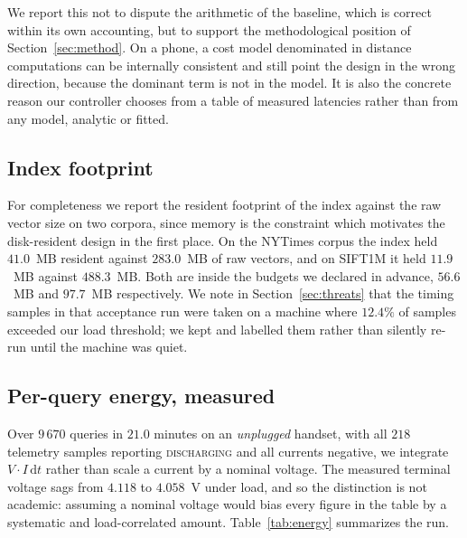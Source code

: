 \documentclass[journal]{IEEEtran}
\begin{document}
We report this not to dispute the arithmetic of the baseline, which is
correct within its own accounting, but to support the methodological
position of Section~\ref{sec:method}. On a phone, a cost model denominated
in distance computations can be internally consistent and still point the
design in the wrong direction, because the dominant term is not in the
model. It is also the concrete reason our controller chooses from a table
of measured latencies rather than from any model, analytic or fitted.

\subsection{Index footprint}

For completeness we report the resident footprint of the index against the
raw vector size on two corpora, since memory is the constraint which
motivates the disk-resident design in the first place. On the NYTimes
corpus the index held $41.0$~MB resident against $283.0$~MB of raw vectors,
and on SIFT1M it held $11.9$~MB against $488.3$~MB. Both are inside the
budgets we declared in advance, $56.6$~MB and $97.7$~MB respectively. We
note in Section~\ref{sec:threats} that the timing samples in that
acceptance run were taken on a machine where $12.4\%$ of samples exceeded
our load threshold; we kept and labelled them rather than silently re-run
until the machine was quiet.

\subsection{Per-query energy, measured}
\label{sec:energy}

Over $9\,670$ queries in $21.0$ minutes on an \emph{unplugged} handset,
with all $218$ telemetry samples reporting \textsc{discharging} and all
currents negative, we integrate $V \cdot I \,\mathrm{d}t$ rather than scale
a current by a nominal voltage. The measured terminal voltage sags from
$4.118$ to $4.058$~V under load, and so the distinction is not academic:
assuming a nominal voltage would bias every figure in the table by a
systematic and load-correlated amount. Table~\ref{tab:energy} summarizes
the run.
\end{document}
